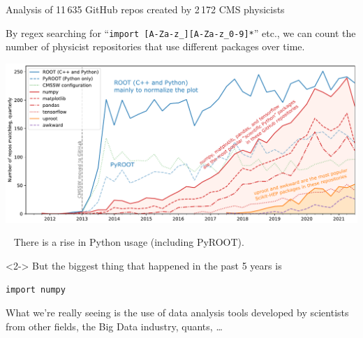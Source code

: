 \documentclass[aspectratio=169]{beamer}
\begin{document}
\begin{frame}{Analysis of 11\,635 GitHub repos created by 2\,172 CMS physicists}
\vspace{0.25 cm}

By regex searching for ``\texttt{import [A-Za-z_][A-Za-z_0-9]*}'' etc., we can count the number of physicist repositories that use different packages over time.

\vspace{0.2 cm}

\includegraphics[width=\linewidth]{PLOTS/gihub-package-fullstudy.pdf}
\end{frame}

\begin{frame}[fragile]{\mbox{ }}
\Large
There is a rise in Python usage (including PyROOT).

\vspace{1.5 cm}
\begin{uncoverenv}<2->
But the biggest thing that happened in the past 5 years is

\begin{center}
\begin{minipage}{3.5 cm}
\begin{verbatim}
import numpy
\end{verbatim}
\end{minipage}
\end{center}

\vspace{0.2 cm}
\begin{spacing}{1.0}
What we're really seeing is the use of data analysis tools developed by scientists from other fields, the Big Data industry, quants, \dots
\end{spacing}
\end{uncoverenv}
\end{frame}
\end{document}
